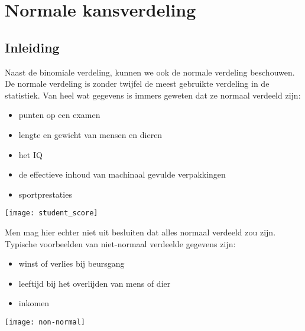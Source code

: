 \documentclass[a4paper,12pt, twoside]{article}
\begin{document}
\cleardoublepage
\section{Normale kansverdeling}

\subsection{Inleiding}

Naast de binomiale verdeling, kunnen we ook de normale verdeling beschouwen. De normale verdeling is zonder twijfel de meest gebruikte verdeling in de statistiek. Van heel wat gegevens is immers geweten dat ze normaal verdeeld zijn:

\begin{minipage}{0.5\textwidth}
\begin{itemize}
  \item punten op een examen
  \item lengte en gewicht van mensen en dieren
  \item het IQ
  \item de effectieve inhoud van machinaal gevulde verpakkingen
  \item sportprestaties
\end{itemize}
\vspace*{1cm}
\end{minipage}
\begin{minipage}{0.5\textwidth}
  \begin{center}
    \texttt{[image: student\_score]}
  \end{center}
\end{minipage}

Men mag hier echter niet uit besluiten dat alles normaal verdeeld zou zijn. Typische voorbeelden van niet-normaal verdeelde gegevens zijn:

\begin{itemize}
  \item winst of verlies bij beursgang
  \item leeftijd bij het overlijden van mens of dier
  \item inkomen
\end{itemize}
  \begin{center}
    \texttt{[image: non-normal]}
  \end{center}
\end{document}
